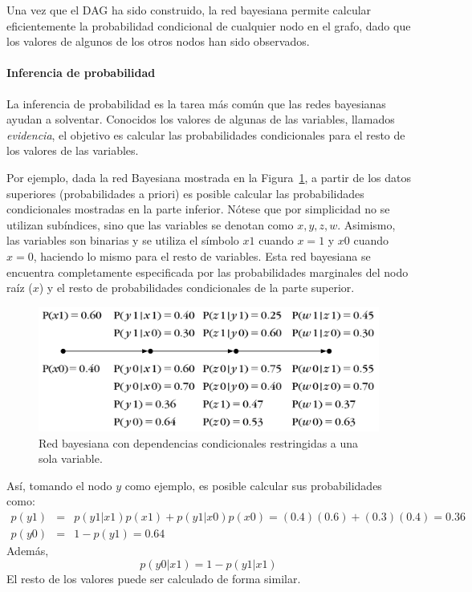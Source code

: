 \documentclass{article}
\begin{document}
Una vez que el DAG ha sido construido, la red bayesiana permite calcular eficientemente la probabilidad condicional de cualquier nodo en el grafo, dado que los valores de algunos de los otros nodos han sido observados.

\paragraph{Inferencia de probabilidad}
\label{par:inferencia_de_probabilidad}
La inferencia de probabilidad es la tarea más común que las redes bayesianas ayudan a solventar.
Conocidos los valores de algunas de las variables, llamados \emph{evidencia}, el objetivo es calcular las probabilidades condicionales para el resto de los valores de las variables.

Por ejemplo, dada la red Bayesiana mostrada en la Figura~\ref{fig:red-bayesiana-calculos}, a partir de los datos superiores (probabilidades a priori) es posible calcular las probabilidades condicionales mostradas en la parte inferior.
Nótese que por simplicidad no se utilizan subíndices, sino que las variables se denotan como $x,y,z,w$.
Asimismo, las variables son binarias y se utiliza el símbolo $x1$ cuando $x=1$ y $x0$ cuando $x=0$, haciendo lo mismo para el resto de variables.
Esta red bayesiana se encuentra completamente especificada por las probabilidades marginales del nodo raíz ($x$) y el resto de probabilidades condicionales de la parte superior.

\begin{figure}[h]
	\centering
	\includegraphics[scale=0.25]{resources/images/red-bayesiana-calculos}
	\caption{Red bayesiana con dependencias condicionales restringidas a una sola variable.}
	\label{fig:red-bayesiana-calculos}
\end{figure}

Así, tomando el nodo $y$ como ejemplo, es posible calcular sus probabilidades como:
\begin{eqnarray}
	p(y1) &=& p(y1 | x1)p(x1) + p(y1|x0)p(x0) = (0.4)(0.6) + (0.3)(0.4) = 0.36 \\
	p(y0) &=& 1-p(y1) = 0.64
\end{eqnarray}
Además, 
\begin{equation}
	p(y0 | x1) = 1 - p(y1 | x1)
\end{equation}
El resto de los valores puede ser calculado de forma similar.
\end{document}
